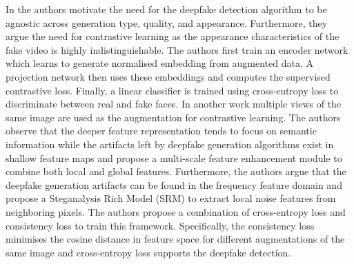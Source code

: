 In \cite{xu2022supervised} the authors motivate the need for the deepfake detection algorithm to be agnostic across generation type, quality, and appearance. Furthermore, they argue the need for contrastive learning as the appearance characteristics of the fake video is highly indistinguishable. The authors first train an encoder network which learns to generate normalised embedding from augmented data.  A projection network then uses these embeddings and computes the supervised contrastive loss. Finally, a linear classifier is trained using cross-entropy loss to discriminate between real and fake faces. In another work \cite{dong2023contrastive} multiple views of the same image are used as the augmentation for contrastive learning. The authors observe that the deeper feature representation tends to focus on semantic information while the artifacts left by deepfake generation algorithms exist in shallow feature maps and propose a multi-scale feature enhancement module to combine both local and global features. Furthermore, the authors argue that the deepfake generation artifacts can be found in the frequency feature domain and propose a Steganalysis Rich Model (SRM) \cite{fridrich2012rich} to extract local noise features from neighboring pixels. The authors propose a combination of cross-entropy loss and consistency loss to train this framework. Specifically, the consistency loss minimises the cosine distance in feature space for different augmentations of the same image and cross-entropy loss supports the deepfake detection. 

